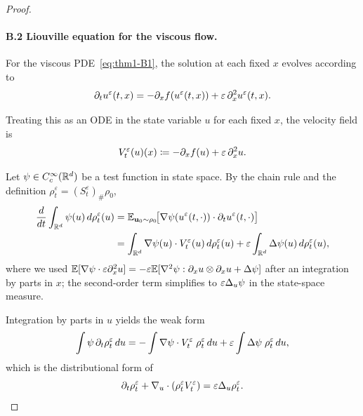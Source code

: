 \begin{proof}
\paragraph{B.2 Liouville equation for the viscous flow.}
For the viscous PDE~\eqref{eq:thm1-B1}, the solution at each fixed $x$ evolves according to
\begin{equation}
\partial_{t} u^{\varepsilon}(t, x) = -\partial_{x} f(u^{\varepsilon}(t, x)) + \varepsilon\, \partial_{x}^{2} u^{\varepsilon}(t, x).
\label{eq:thm1-B2-ode}
\end{equation}

Treating this as an ODE in the state variable $u$ for each fixed $x$, the velocity field is
\begin{equation}
V_{t}^{\varepsilon}(u)(x) \coloneqq -\partial_{x} f(u) + \varepsilon\, \partial_{x}^{2} u.
\label{eq:thm1-B2-V}
\end{equation}

Let $\psi \in C_{c}^{\infty}(\mathbb{R}^{d})$ be a test function in state space. By the chain rule and the definition $\rho_{t}^{\varepsilon} = (S_{t}^{\varepsilon})_{\#} \rho_{0}$,
\begin{align}
\frac{d}{dt} \int_{\mathbb{R}^{d}} \psi(u) \, d\rho_{t}^{\varepsilon}(u)
&= \mathbb{E}_{\mathbf{u}_{0} \sim \rho_{0}}\!\bigl[ \nabla \psi(u^{\varepsilon}(t, \cdot)) \cdot \partial_{t} u^{\varepsilon}(t, \cdot) \bigr] \notag \\
&= \int_{\mathbb{R}^{d}} \nabla \psi(u) \cdot V_{t}^{\varepsilon}(u) \, d\rho_{t}^{\varepsilon}(u)
   + \varepsilon \int_{\mathbb{R}^{d}} \Delta \psi(u) \, d\rho_{t}^{\varepsilon}(u),
\label{eq:thm1-B2-chain}
\end{align}
where we used $\mathbb{E}[\nabla \psi \cdot \varepsilon \partial_{x}^{2} u] = -\varepsilon \mathbb{E}[\nabla^{2} \psi : \partial_{x} u \otimes \partial_{x} u + \Delta \psi]$ after an integration by parts in $x$; the second-order term simplifies to $\varepsilon \Delta_{u} \psi$ in the state-space measure.

Integration by parts in $u$ yields the weak form
\begin{equation}
\int \psi \, \partial_{t} \rho_{t}^{\varepsilon} \, du
= - \int \nabla \psi \cdot V_{t}^{\varepsilon} \; \rho_{t}^{\varepsilon} \, du
+ \varepsilon \int \Delta \psi \; \rho_{t}^{\varepsilon} \, du,
\label{eq:thm1-B2-weak}
\end{equation}
which is the distributional form of
\begin{equation}
\partial_{t} \rho_{t}^{\varepsilon} + \nabla_{u} \cdot (\rho_{t}^{\varepsilon} V_{t}^{\varepsilon}) = \varepsilon \Delta_{u} \rho_{t}^{\varepsilon}.
\label{eq:thm1-B2-liouville}
\end{equation}


\end{proof}
